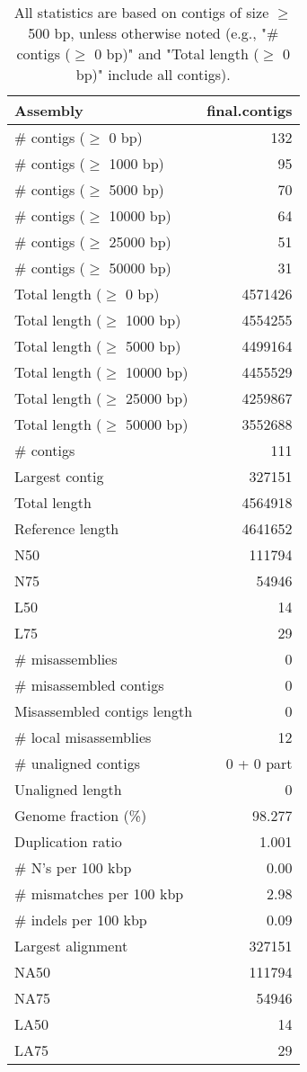 \documentclass[12pt,a4paper]{article}
\begin{document}
\begin{table}[ht]
\begin{center}
\caption{All statistics are based on contigs of size $\geq$ 500 bp, unless otherwise noted (e.g., "\# contigs ($\geq$ 0 bp)" and "Total length ($\geq$ 0 bp)" include all contigs).}
\begin{tabular}{|l*{1}{|r}|}
\hline
Assembly & final.contigs \\ \hline
\# contigs ($\geq$ 0 bp) & 132 \\ \hline
\# contigs ($\geq$ 1000 bp) & 95 \\ \hline
\# contigs ($\geq$ 5000 bp) & 70 \\ \hline
\# contigs ($\geq$ 10000 bp) & 64 \\ \hline
\# contigs ($\geq$ 25000 bp) & 51 \\ \hline
\# contigs ($\geq$ 50000 bp) & 31 \\ \hline
Total length ($\geq$ 0 bp) & 4571426 \\ \hline
Total length ($\geq$ 1000 bp) & 4554255 \\ \hline
Total length ($\geq$ 5000 bp) & 4499164 \\ \hline
Total length ($\geq$ 10000 bp) & 4455529 \\ \hline
Total length ($\geq$ 25000 bp) & 4259867 \\ \hline
Total length ($\geq$ 50000 bp) & 3552688 \\ \hline
\# contigs & 111 \\ \hline
Largest contig & 327151 \\ \hline
Total length & 4564918 \\ \hline
Reference length & 4641652 \\ \hline
N50 & 111794 \\ \hline
N75 & 54946 \\ \hline
L50 & 14 \\ \hline
L75 & 29 \\ \hline
\# misassemblies & 0 \\ \hline
\# misassembled contigs & 0 \\ \hline
Misassembled contigs length & 0 \\ \hline
\# local misassemblies & 12 \\ \hline
\# unaligned contigs & 0 + 0 part \\ \hline
Unaligned length & 0 \\ \hline
Genome fraction (\%) & 98.277 \\ \hline
Duplication ratio & 1.001 \\ \hline
\# N's per 100 kbp & 0.00 \\ \hline
\# mismatches per 100 kbp & 2.98 \\ \hline
\# indels per 100 kbp & 0.09 \\ \hline
Largest alignment & 327151 \\ \hline
NA50 & 111794 \\ \hline
NA75 & 54946 \\ \hline
LA50 & 14 \\ \hline
LA75 & 29 \\ \hline
\end{tabular}
\end{center}
\end{table}
\end{document}
